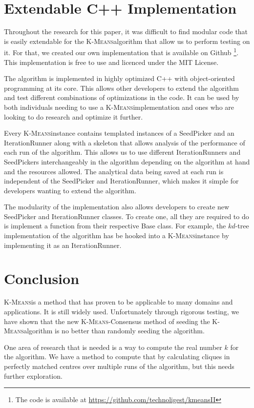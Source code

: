 \documentclass[12pt]{dalthesis}
\newcommand*{\kmeansn}{\textsc{K-Means}} %
\newcommand*{\kmeans}{\kmeansn } %
\begin{document}
\chapter{Extendable C++ Implementation}

Throughout the research for this paper, it was difficult to find modular code that is easily extendable for the \kmeans algorithm that allow us to perform testing on it. For that, we created our own implementation that is available on Github \footnote{The code is available at \url{https://github.com/technoligest/kmeansII}}.  This implementation is free to use and licenced under the MIT License.

The algorithm is implemented in highly optimized C++ with object-oriented programming at its core. This allows other developers to extend the algorithm and test different combinations of optimizations in the code. It can be used by both individuals needing to use a \kmeans implementation and ones who are looking to do research and optimize it further. 

Every \kmeans instance contains templated instances of a SeedPicker and an IterationRunner along with a skeleton that allows analysis of the performance of each run of the algorithm. This allows us to use different IterationRunners and SeedPickers interchangeably in the algorithm depending on the algorithm at hand and the resources allowed. The analytical data being saved at each run is independent of the SeedPicker and IterationRunner, which makes it simple for developers wanting to extend the algorithm.

The modularity of the implementation also allows developers to create new SeedPicker and IterationRunner classes. To create one, all they are required to do is implement a function from their respective Base class. For example, the $kd$-tree implementation of the algorithm has be hooked into a \kmeans instance by implementing it as an IterationRunner.



\chapter{Conclusion}

\kmeans is a method that has proven to be applicable to many domains and applications. It is still widely used. Unfortunately through rigorous testing, we have shown that the new \kmeansn-Consensus method of seeding the \kmeans algorithm is no better than randomly seeding the algorithm.



One area of research that is needed is a way to compute the real number $k$ for the algorithm. We have a method to compute that by calculating cliques in perfectly matched centres over multiple runs of the algorithm, but this needs further exploration. 




\end{document}
